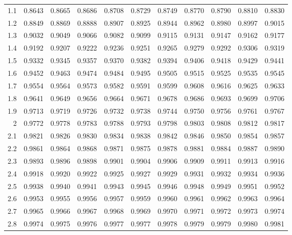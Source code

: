 \begin{table}[t]
\begin{tabular}{r|rrrrr|rrrrr}
		1.1 & 0.8643 & 0.8665 & 0.8686 & 0.8708 & 0.8729 & 0.8749 & 0.8770 & 0.8790 & 0.8810 & 0.8830 \\ 
		\rowcolor{lightgray}1.2 & 0.8849 & 0.8869 & 0.8888 & 0.8907 & 0.8925 & 0.8944 & 0.8962 & 0.8980 & 0.8997 & 0.9015 \\ 
		1.3 & 0.9032 & 0.9049 & 0.9066 & 0.9082 & 0.9099 & 0.9115 & 0.9131 & 0.9147 & 0.9162 & 0.9177 \\ 
		\rowcolor{lightgray}1.4 & 0.9192 & 0.9207 & 0.9222 & 0.9236 & 0.9251 & 0.9265 & 0.9279 & 0.9292 & 0.9306 & 0.9319 \\ 
		1.5 & 0.9332 & 0.9345 & 0.9357 & 0.9370 & 0.9382 & 0.9394 & 0.9406 & 0.9418 & 0.9429 & 0.9441 \\ 
		\rowcolor{lightgray}1.6 & 0.9452 & 0.9463 & 0.9474 & 0.9484 & 0.9495 & 0.9505 & 0.9515 & 0.9525 & 0.9535 & 0.9545 \\ 
		1.7 & 0.9554 & 0.9564 & 0.9573 & 0.9582 & 0.9591 & 0.9599 & 0.9608 & 0.9616 & 0.9625 & 0.9633 \\ 
		\rowcolor{lightgray}1.8 & 0.9641 & 0.9649 & 0.9656 & 0.9664 & 0.9671 & 0.9678 & 0.9686 & 0.9693 & 0.9699 & 0.9706 \\ 
		1.9 & 0.9713 & 0.9719 & 0.9726 & 0.9732 & 0.9738 & 0.9744 & 0.9750 & 0.9756 & 0.9761 & 0.9767 \\ 
		\rowcolor{lightgray}2 & 0.9772 & 0.9778 & 0.9783 & 0.9788 & 0.9793 & 0.9798 & 0.9803 & 0.9808 & 0.9812 & 0.9817 \\ 
		2.1 & 0.9821 & 0.9826 & 0.9830 & 0.9834 & 0.9838 & 0.9842 & 0.9846 & 0.9850 & 0.9854 & 0.9857 \\ 
		\rowcolor{lightgray}2.2 & 0.9861 & 0.9864 & 0.9868 & 0.9871 & 0.9875 & 0.9878 & 0.9881 & 0.9884 & 0.9887 & 0.9890 \\ 
		2.3 & 0.9893 & 0.9896 & 0.9898 & 0.9901 & 0.9904 & 0.9906 & 0.9909 & 0.9911 & 0.9913 & 0.9916 \\ 
		\rowcolor{lightgray}2.4 & 0.9918 & 0.9920 & 0.9922 & 0.9925 & 0.9927 & 0.9929 & 0.9931 & 0.9932 & 0.9934 & 0.9936 \\ 
		2.5 & 0.9938 & 0.9940 & 0.9941 & 0.9943 & 0.9945 & 0.9946 & 0.9948 & 0.9949 & 0.9951 & 0.9952 \\ 
		\rowcolor{lightgray}2.6 & 0.9953 & 0.9955 & 0.9956 & 0.9957 & 0.9959 & 0.9960 & 0.9961 & 0.9962 & 0.9963 & 0.9964 \\ 
		2.7 & 0.9965 & 0.9966 & 0.9967 & 0.9968 & 0.9969 & 0.9970 & 0.9971 & 0.9972 & 0.9973 & 0.9974 \\ 
		\rowcolor{lightgray}2.8 & 0.9974 & 0.9975 & 0.9976 & 0.9977 & 0.9977 & 0.9978 & 0.9979 & 0.9979 & 0.9980 & 0.9981 \\ 

\end{tabular}
\end{table}
